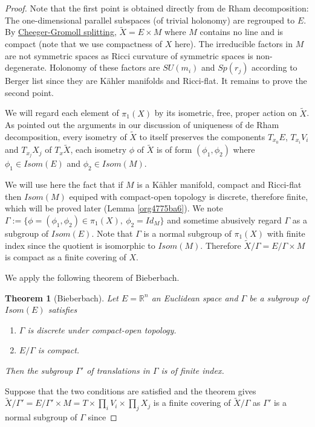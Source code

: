 \documentclass[11pt]{article}
\newtheorem{theorem}{Theorem}
\begin{document}
\begin{proof}
Note that the first point is obtained directly from de Rham decomposition: The one-dimensional
parallel subspaces (of trivial holonomy) are regrouped to \(E\). By \href{Cheeger-Gromoll-splitting.org}{Cheeger-Gromoll splitting},
\(\tilde X = E\times M\) where \(M\) contains no line and is compact (note that we use compactness of
\(X\) here). The irreducible factors in \(M\) are not symmetric spaces as Ricci curvature of
symmetric spaces is non-degenerate. Holonomy of these factors are \(SU(m_i)\) and \(Sp(r_j)\)
according to Berger list since they are Kähler manifolds and Ricci-flat. It remains to prove the
second point.

We will regard each element of \(\pi_1(X)\) by its isometric, free, proper action on \(\tilde X\). As
pointed out the arguments in our discussion of uniqueness of de Rham decomposition, every isometry
of \(\tilde X\) to itself preserves the components \(T_{x_0}E\), \(T_{x_i}V_i\) and \(T_{x_j}X_j\)
of \(T_x \tilde X\), each isometry \(\phi\) of \(\tilde X\) is of form \((\phi_1,\phi_2)\) where \(\phi_1\in
Isom(E)\) and \(\phi_2\in Isom(M)\).

We will use here the fact that if \(M\) is a Kähler manifold, compact and Ricci-flat then \(Isom(M)\)
equiped with compact-open topology is discrete, therefore finite, which will be proved later (Lemma
\ref{org4775ba6}). We note \(\Gamma := \{\phi = (\phi_1,\phi_2)\in \pi_1(X),\ \phi_2 = Id_M\}\) and
sometime abusively regard \(\Gamma\) as a subgroup of \(Isom(E)\). Note that \(\Gamma\) is a normal
subgroup of \(\pi_1(X)\) with finite index since the quotient is isomorphic to \(Isom(M)\). Therefore
\(\tilde X/\Gamma = E/\Gamma\times M\) is compact as a finite covering of \(X\).

We apply the following theorem of Bieberbach.
\begin{theorem}[Bieberbach]
Let \(E = \mathbb{R}^n\) an Euclidean space and \(\Gamma\) be a subgroup of \(Isom(E)\) satisfies
\begin{enumerate}
\item \(\Gamma\) is discrete under compact-open topology.
\item \(E/\Gamma\) is compact.
\end{enumerate}
Then the subgroup \(\Gamma'\) of translations in \(\Gamma\) is of finite index.
\end{theorem}

Suppose that the two conditions are satisfied and the theorem gives \(\tilde X/\Gamma' =
E/\Gamma'\times M = T\times \prod_i V_i\times \prod_j X_j\) is a finite covering of
\(\tilde X/\Gamma\) as \(\Gamma'\) is a normal subgroup of \(\Gamma\) since


\end{proof}
\end{document}
